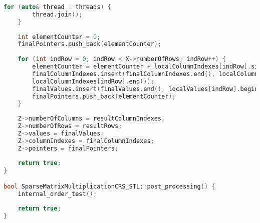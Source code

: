 \documentclass[a4paper, 14pt]{article}
\theoremstyle{plain}
\begin{document}
\begin{lstlisting}[language=C++,caption=Файл sparse\_matmult\_crs\_stl.cpp]
	for (auto& thread : threads) {
		thread.join();
	}
	
	int elementCounter = 0;
	finalPointers.push_back(elementCounter);
	
	for (int indRow = 0; indRow < X->numberOfRows; indRow++) {
		elementCounter = elementCounter + localColumnIndexes[indRow].size();
		finalColumnIndexes.insert(finalColumnIndexes.end(), localColumnIndexes[indRow].begin(),
		localColumnIndexes[indRow].end());
		finalValues.insert(finalValues.end(), localValues[indRow].begin(), localValues[indRow].end());
		finalPointers.push_back(elementCounter);
	}
	
	Z->numberOfColumns = resultColumnIndexes;
	Z->numberOfRows = resultRows;
	Z->values = finalValues;
	Z->columnIndexes = finalColumnIndexes;
	Z->pointers = finalPointers;
	
	return true;
}

bool SparseMatrixMultiplicationCRS_STL::post_processing() {
	internal_order_test();
	
	return true;
}
\end{lstlisting}
\end{document}
